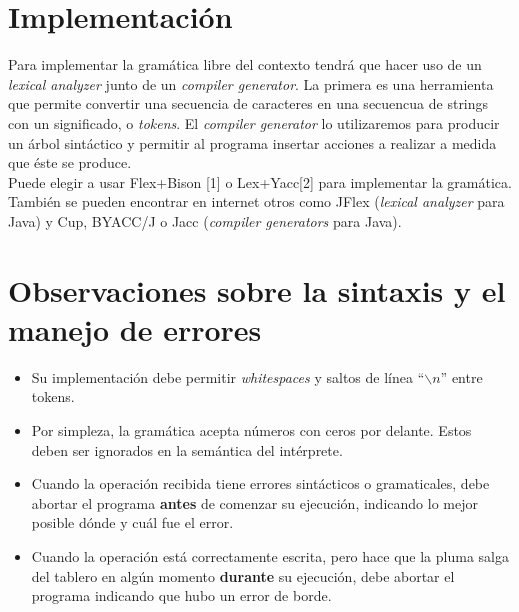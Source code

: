 \documentclass[dcc]{fcfmcourse}
\begin{document}
\section*{Implementación}
Para implementar la gramática libre del contexto tendrá que hacer uso de un \textit{lexical analyzer} junto de un \textit{compiler generator}. La primera es una herramienta que permite convertir una secuencia de caracteres en una secuencua de strings con un significado, o \textit{tokens}. El \textit{compiler generator} lo utilizaremos para producir un árbol sintáctico y permitir al programa insertar acciones a realizar a medida que éste se produce.\\

Puede elegir a usar Flex+Bison [1] o Lex+Yacc[2] para implementar la gramática. También se pueden encontrar en internet otros como JFlex (\textit{lexical analyzer} para Java) y Cup, BYACC/J o Jacc (\textit{compiler generators} para Java).
\section*{Observaciones sobre la sintaxis y el manejo de errores}
\begin{itemize}
\item Su implementación debe permitir \textit{whitespaces} y saltos de línea ``$\backslash n$'' entre tokens.
\item Por simpleza, la gramática acepta números con ceros por delante. Estos deben ser ignorados en la semántica del intérprete.
\item Cuando la operación recibida tiene errores sintácticos o gramaticales, debe abortar el programa \textbf{antes} de comenzar su ejecución, indicando lo mejor posible dónde y cuál fue el error.
\item Cuando la operación está correctamente escrita, pero hace que la pluma salga del tablero en algún momento \textbf{durante} su ejecución, debe abortar el programa indicando que hubo un error de borde.
\end{itemize}
\end{document}
